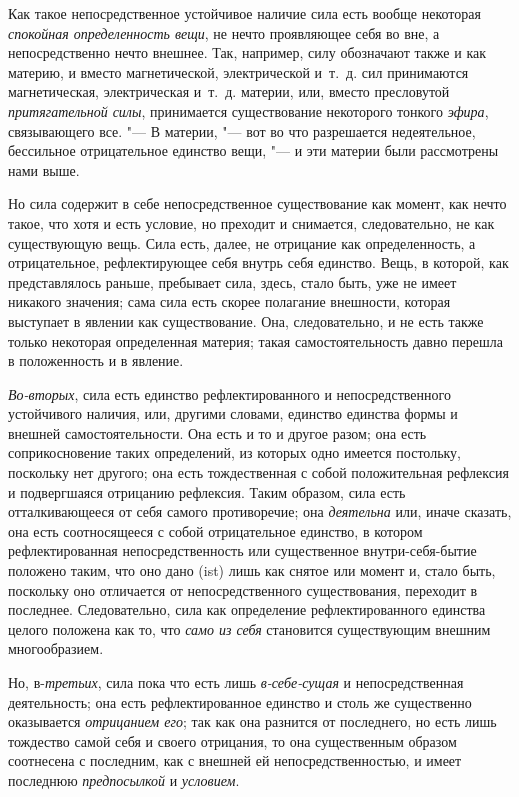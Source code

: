 Как такое непосредственное устойчивое наличие сила есть вообще некоторая
{\em спокойная определенность вещи}, не нечто
проявляющее себя во вне, а непосредственно нечто внешнее. Так, например,
силу обозначают также и как материю, и вместо магнетической, электрической
и~т.~д. сил принимаются магнетическая, электрическая и~т.~д. материи, или,
вместо пресловутой {\em притягательной силы},
принимается существование некоторого тонкого
{\em эфира}, связывающего все. "--- В материи, "--- вот во
что разрешается недеятельное, бессильное отрицательное единство вещи, "--- и
эти материи были рассмотрены нами выше.

Но сила содержит в себе непосредственное существование как момент, как нечто
такое, что хотя и есть условие, но преходит и снимается, следовательно, не
как существующую вещь. Сила есть, далее, не отрицание как определенность, а
отрицательное, рефлектирующее себя внутрь себя единство. Вещь, в которой,
как представлялось раньше, пребывает сила, здесь, стало быть, уже не имеет
никакого значения; сама сила есть скорее полагание внешности, которая
выступает в явлении как существование. Она, следовательно, и не есть также
только некоторая определенная материя; такая самостоятельность давно
перешла в положенность и в явление.

{\em Во-вторых}, сила есть единство рефлектированного и
непосредственного устойчивого наличия, или, другими словами, единство
единства формы и внешней самостоятельности. Она есть и то и другое разом;
она есть соприкосновение таких определений, из которых одно имеется
постольку, поскольку нет другого; она есть тождественная с собой
положительная рефлексия и подвергшаяся отрицанию рефлексия. Таким образом,
сила есть отталкивающееся от себя самого противоречие; она
{\em деятельна} или, иначе сказать, она есть
соотносящееся с собой отрицательное единство, в котором рефлектированная
непосредственность или существенное внутри-себя-бытие положено таким, что
оно дано (ist) лишь как снятое или момент и, стало быть, поскольку оно
отличается от непосредственного существования, переходит в последнее.
Следовательно, сила как определение рефлектированного единства целого
положена как то, что {\em само из себя} становится
существующим внешним многообразием.

Но, в-{\em третьих}, сила пока что есть лишь
{\em в-себе-сущая} и непосредственная деятельность; она
есть рефлектированное единство и столь же существенно оказывается
{\em отрицанием его}; так как она разнится от
последнего, но есть лишь тождество самой себя и своего отрицания, то она
существенным образом соотнесена с последним, как с внешней ей
непосредственностью, и имеет последнюю
{\em предпосылкой} и
{\em условием}.

